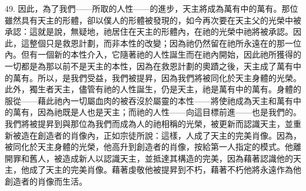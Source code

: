 49. 因此，為了我們——所取的人性——的進步，天主將成為萬有中的萬有。那位雖然具有天主的形體，卻以僕人的形體被發現的，如今再次要在天主父的光榮中被承認：這就是說，無疑地，祂居住在天主的形體內，在祂的光榮中祂將被承認。因此，這整個只是救恩計劃，而非本性的改變；因為祂仍然留在祂所永遠在的那一位內。但有一個新的本性介入，它隨著祂的人性誕生而在祂內開始，因此祂所獲得的一切都是為那以前不是天主的本性，因為在救恩計劃的奧蹟之後，天主成了萬有中的萬有。所以，是我們受益，我們被提昇，因為我們將被同化於天主身體的光榮。此外，獨生者天主，儘管有祂的人性誕生，仍是天主，祂是萬有中的萬有。身體的服從——藉此祂內一切屬血肉的被吞沒於屬靈的本性——將使祂成為天主和萬有中的萬有，因為祂既是人也是天主；而祂的人性——向這目標前進——也是我們的。我們將被提昇到與那位為我們而成為人的祂相稱的光榮，被更新而認識天主，並重新被造在創造者的肖像內，正如宗徒所說：這樣，人成了天主的完美肖像。因為，被同化於天主身體的光榮，他高升到創造者的肖像，按給第一人指定的模式。他離開罪和舊人，被造成新人以認識天主，並抵達其構造的完美，因為藉著認識他的天主，他成了天主的完美肖像。藉著虔敬他被提昇到不朽，藉著不朽他將永遠作為他創造者的肖像而生活。\par



\section{}

